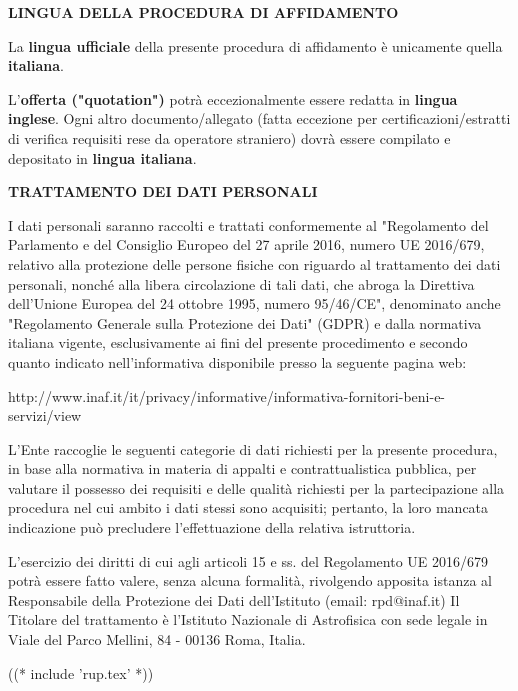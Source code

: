 \textbf{LINGUA DELLA PROCEDURA DI AFFIDAMENTO}

La \textbf{lingua ufficiale} della presente procedura di affidamento è unicamente quella \textbf{italiana}. 

L'\textbf{offerta ("quotation")} potrà eccezionalmente essere
redatta in \textbf{lingua inglese}. Ogni altro documento/allegato
(fatta eccezione per certificazioni/estratti di verifica requisiti
rese da operatore straniero) dovrà essere compilato e depositato in
\textbf{lingua italiana}.

\textbf{TRATTAMENTO DEI DATI PERSONALI}

I dati personali saranno raccolti e trattati conformemente al "Regolamento
del Parlamento e del Consiglio Europeo del 27 aprile 2016, numero UE
2016/679,  relativo alla protezione delle persone fisiche con riguardo
al trattamento dei dati personali, nonché alla libera circolazione
di tali dati, che abroga la Direttiva dell'Unione Europea del 24
ottobre 1995, numero 95/46/CE", denominato anche "Regolamento Generale
sulla Protezione dei Dati" (GDPR) e dalla normativa italiana vigente,
esclusivamente ai fini del presente procedimento e secondo quanto indicato
nell'informativa disponibile presso la seguente pagina web:

http://www.inaf.it/it/privacy/informative/informativa-fornitori-beni-e-servizi/view

L'Ente raccoglie le seguenti categorie di dati richiesti per la
presente procedura, in base alla normativa in materia di appalti
e contrattualistica pubblica, per valutare il possesso dei requisiti
e delle qualità richiesti per la partecipazione alla procedura nel cui
ambito i dati stessi sono acquisiti; pertanto, la loro mancata indicazione
può precludere l'effettuazione della relativa istruttoria.

L'esercizio dei diritti di cui agli articoli 15 e ss. del Regolamento UE
2016/679 potrà essere fatto valere, senza alcuna formalità, rivolgendo
apposita istanza al Responsabile della Protezione dei Dati dell'Istituto
(email: rpd@inaf.it) Il Titolare del trattamento è l'Istituto Nazionale
di Astrofisica con sede legale in Viale del Parco Mellini, 84 - 00136
Roma, Italia.

((* include 'rup.tex' *))

